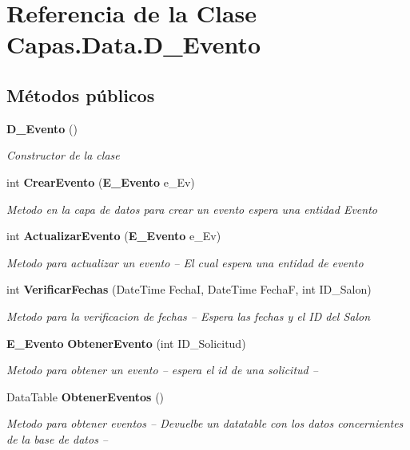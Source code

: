 \section{Referencia de la Clase Capas.\+Data.\+D\+\_\+\+Evento}
\label{class_capas_1_1_data_1_1_d___evento}
\subsection*{Métodos públicos}
\begin{DoxyCompactItemize}
\item 
{\bf D\+\_\+\+Evento} ()
\begin{DoxyCompactList}\small\item\em Constructor de la clase \end{DoxyCompactList}\item 
int {\bf Crear\+Evento} ({\bf E\+\_\+\+Evento} e\+\_\+\+Ev)
\begin{DoxyCompactList}\small\item\em Metodo en la capa de datos para crear un evento espera una entidad Evento \end{DoxyCompactList}\item 
int {\bf Actualizar\+Evento} ({\bf E\+\_\+\+Evento} e\+\_\+\+Ev)
\begin{DoxyCompactList}\small\item\em Metodo para actualizar un evento -- El cual espera una entidad de evento \end{DoxyCompactList}\item 
int {\bf Verificar\+Fechas} (Date\+Time FechaI, Date\+Time FechaF, int I\+D\+\_\+\+Salon)
\begin{DoxyCompactList}\small\item\em Metodo para la verificacion de fechas -- Espera las fechas y el ID del Salon \end{DoxyCompactList}\item 
{\bf E\+\_\+\+Evento} {\bf Obtener\+Evento} (int I\+D\+\_\+\+Solicitud)
\begin{DoxyCompactList}\small\item\em Metodo para obtener un evento -- espera el id de una solicitud -- \end{DoxyCompactList}\item 
Data\+Table {\bf Obtener\+Eventos} ()
\begin{DoxyCompactList}\small\item\em Metodo para obtener eventos -- Devuelbe un datatable con los datos concernientes de la base de datos -- \end{DoxyCompactList}\item 

\end{DoxyCompactItemize}
